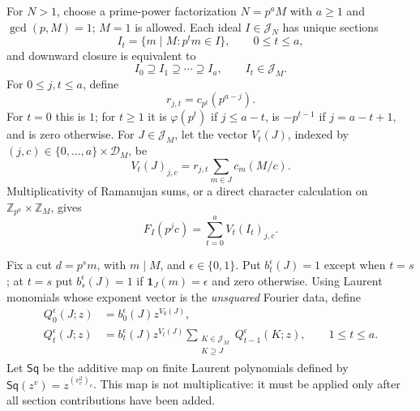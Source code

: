 For $N>1$, choose a prime-power factorization $N=p^aM$ with
$a\ge1$ and $\gcd(p,M)=1$; $M=1$ is allowed.  Each ideal $I\in\mathcal J_N$
has unique sections
\[
 I_t=\{m\mid M:p^tm\in I\},\qquad 0\le t\le a,
\]
and downward closure is equivalent to
\begin{equation}\label{eq:ideal-flag}
 I_0\supseteq I_1\supseteq\cdots\supseteq I_a,
 \qquad I_t\in\mathcal J_M.
\end{equation}
For $0\le j,t\le a$, define
\[
 r_{j,t}=c_{p^t}(p^{a-j}).
\]
For $t=0$ this is $1$; for $t\ge1$ it is $\varphi(p^t)$ if
$j\le a-t$, is $-p^{t-1}$ if $j=a-t+1$, and is zero otherwise.
For $J\in\mathcal J_M$, let the vector $V_t(J)$, indexed by
$(j,c)\in\{0,\ldots,a\}\times\mathcal D_M$, be
\begin{equation}\label{eq:factor-contribution}
 V_t(J)_{j,c}=r_{j,t}\sum_{m\in J}c_m(M/c).
\end{equation}
Multiplicativity of Ramanujan sums, or a direct character calculation on
$\mathbb Z_{p^a}\times\mathbb Z_M$, gives
\begin{equation}\label{eq:factor-spectral-sum}
 F_I(p^jc)=\sum_{t=0}^a V_t(I_t)_{j,c}.
\end{equation}

Fix a cut $d=p^sm$, with $m\mid M$, and $\epsilon\in\{0,1\}$.
Put $b_t^{\epsilon}(J)=1$ except when $t=s$; at $t=s$ put
$b_s^{\epsilon}(J)=1$ if $\mathbf1_J(m)=\epsilon$ and zero otherwise.
Using Laurent monomials whose exponent vector is the \emph{unsquared}
Fourier data, define
\begin{align}
 Q_0^{\epsilon}(J;z)&=b_0^{\epsilon}(J)z^{V_0(J)},\label{eq:transfer-start}\\
 Q_t^{\epsilon}(J;z)&=b_t^{\epsilon}(J)z^{V_t(J)}
          \sum_{\substack{K\in\mathcal J_M\\K\supseteq J}}
                    Q_{t-1}^{\epsilon}(K;z),\qquad 1\le t\le a.
 \label{eq:transfer-step}
\end{align}
Let $\mathsf{Sq}$ be the additive map on finite Laurent polynomials defined
by $\mathsf{Sq}(z^v)=z^{(v_c^2)_c}$.  This map is not multiplicative: it
must be applied only after all section contributions have been added.

